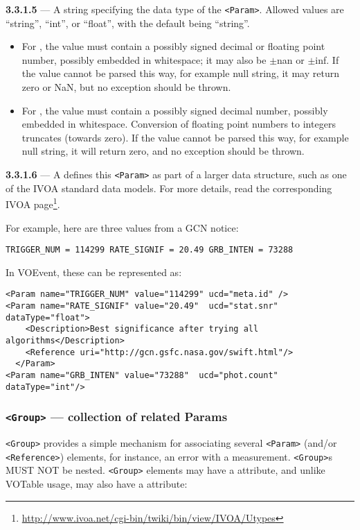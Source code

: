 \documentclass[11pt,a4paper]{ivoa}
\begin{document}
\noindent \textbf{3.3.1.5} \label{sec:3.3.1.5} --- A string specifying
the data type of the \verb|<Param>|. Allowed values are ``string'', ``int'', or
``float'', with the default being ``string''.
\begin{itemize}
\item For , the value must contain a possibly signed decimal
or floating point number, possibly embedded in whitespace; it may also be
$\pm$nan or $\pm$inf. If the value cannot be parsed this way, for example null
string, it may return zero or NaN, but no exception should be thrown.
\item For , the value must contain a possibly signed decimal
number, possibly embedded in whitespace. Conversion of floating point numbers to
integers truncates (towards zero). If the value cannot be parsed this way, for
example null string, it will return zero, and no exception should be thrown.
\end{itemize}

\noindent \textbf{3.3.1.6} \label{sec:3.3.1.6} --- A  defines
this \verb|<Param>| as part of a larger data structure, such as one of the IVOA
standard data models. For more details, read the corresponding IVOA
page\footnote{\url{http://www.ivoa.net/cgi-bin/twiki/bin/view/IVOA/Utypes}}.

For example, here are three values from a GCN \citep{bib04} notice:
\begin{lstlisting}
TRIGGER_NUM = 114299 RATE_SIGNIF = 20.49 GRB_INTEN = 73288
\end{lstlisting}

In VOEvent, these can be represented as:
\begin{lstlisting}
<Param name="TRIGGER_NUM" value="114299" ucd="meta.id" />
<Param name="RATE_SIGNIF" value="20.49"  ucd="stat.snr" dataType="float">
    <Description>Best significance after trying all algorithms</Description>
    <Reference uri="http://gcn.gsfc.nasa.gov/swift.html"/>
  </Param>
<Param name="GRB_INTEN" value="73288"  ucd="phot.count" dataType="int"/>
\end{lstlisting}

\subsubsection{\texttt{<Group>} --- collection of related Params}
\label{sec:3.3.2}
\verb|<Group>| provides a simple mechanism for associating several \verb|<Param>|
(and/or \verb|<Reference>|) elements, for instance, an error with a measurement.
\verb|<Group>|s MUST NOT be nested. \verb|<Group>| elements may have a
attribute, and unlike VOTable usage, may also have a  attribute:
\end{document}
